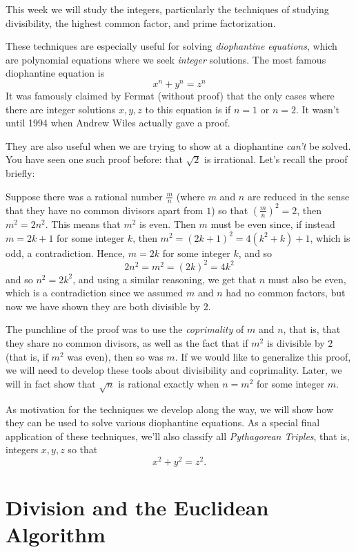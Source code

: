\documentclass[11pt,dvipsnames]{book}
\numberwithin{equation}{section} %
\numberwithin{figure}{section} %
\numberwithin{table}{section} %
\begin{document}
This week we will study the integers, particularly the techniques of studying divisibility, the highest common factor, and prime factorization. 

These techniques are especially useful for solving {\it diophantine equations}, which are polynomial equations where we seek {\it integer} solutions. The most famous diophantine equation is 
\[
x^{n}+y^{n}=z^{n}\]
It was famously claimed by Fermat (without proof) that the only cases where there are integer solutions $x,y,z$ to this equation is if $n=1$ or $n=2$. It wasn't until 1994 when Andrew Wiles actually gave a proof. 

They are also useful when we are trying to show at a diophantine {\it can't} be solved. You have seen one such proof before: that $\sqrt{2}$ is irrational. Let's recall the proof briefly:

Suppose there was a rational number $\frac{m}{n}$ (where $m$ and $n$ are reduced in the sense that they have no common divisors apart from $1$) so that $\left(\frac{m}{n}\right)^2=2$, then $m^2=2n^2$. This means that $m^2$ is even. Then $m$ must be even since, if instead $m=2k+1$ for some integer $k$, then $m^2=(2k+1)^2=4(k^2+k)+1$, which is odd, a contradiction. Hence, $m=2k$ for some integer $k$, and so
\[
2n^2=m^2=(2k)^2=4k^2\]
and so $n^2=2k^2$, and using a similar reasoning, we get that $n$ must also be even, which is a contradiction since we assumed $m$ and $n$ had no common factors, but now we have shown they are both divisible by $2$. 

The punchline of the proof was to use the {\it coprimality} of $m$ and $n$, that is, that they share no common divisors, as well as the fact that if $m^2$ is divisible by $2$ (that is, if $m^2$ was even), then so was $m$. If we would like to generalize this proof, we will need to develop  these tools about divisibility and coprimality. Later, we will in fact show that $\sqrt{n}$ is rational exactly when $n=m^2$ for some integer $m$. 



As motivation for the techniques we develop along the way, we will show how they can be used to solve various diophantine equations. As a special final application of these techniques, we'll also classify all {\it Pythagorean Triples}, that is, integers $x,y,z$ so that 
\[
x^2+y^2=z^2.\]



\section{Division and the Euclidean Algorithm}
\end{document}
